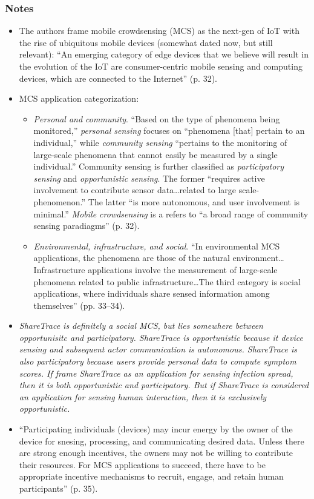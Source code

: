 \subsubsection*{Notes}
\begin{itemize}
\item The authors frame mobile crowdsensing (MCS) as the next-gen of IoT with the rise of ubiquitous mobile devices (somewhat dated now, but still relevant): ``An emerging category of edge devices that we believe will result in the evolution of the IoT are consumer-centric mobile sensing and computing devices, which are connected to the Internet'' (p. 32).
\item MCS application categorization:
	\begin{itemize}
	\item \emph{Personal and community}. ``Based on the type of phenomena being monitored,'' \emph{personal sensing} focuses on ``phenomena [that] pertain to an individual,'' while \emph{community sensing} ``pertains to the monitoring of large-scale phenomena that cannot easily be measured by a single individual.'' Community sensing is further classified as \emph{participatory sensing} and \emph{opportunistic sensing}. The former ``requires active involvement to contribute sensor data{\ldots}related to large scale-phenomenon.'' The latter ``is more autonomous, and user involvement is minimal.'' \emph{Mobile crowdsensing} is a refers to ``a broad range of community sensing paradiagms'' (p. 32).
	\item \emph{Environmental, infrastructure, and social}. ``In environmental MCS applications, the phenomena are those of the natural environment{\ldots}Infrastructure applications involve the measurement of large-scale phenomena related to public infrastructure{\ldots}The third category is social applications, where individuals share sensed information among themselves'' (pp. 33--34).
	\end{itemize}
\item \emph{ShareTrace is definitely a social MCS, but lies somewhere between opportunisitc and participatory. ShareTrace is opportunistic because it device sensing and subsequent actor communication is autonomous. ShareTrace is also participatory because users provide personal data to compute symptom scores. If frame ShareTrace as an application for sensing \emph{infection spread}, then it is both opportunistic and participatory. But if ShareTrace is considered an application for sensing \emph{human interaction}, then it is exclusively opportunistic.}
\item ``Participating individuals (devices) may incur energy by the owner of the device for snesing, processing, and communicating desired data. Unless there are strong enough incentives, the owners may not be willing to contribute their resources. For MCS applications to succeed, there have to be appropriate incentive mechanisms to recruit, engage, and retain human participants'' (p. 35).

\end{itemize}
